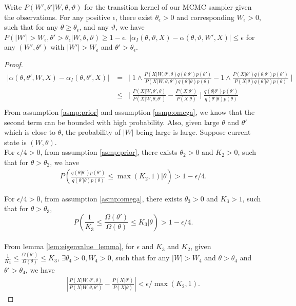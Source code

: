 \begin{proposition}
Write $P(W', \theta' | W, \theta, \vartheta)$ for the transition kernel of our MCMC sampler given the observations. For any positive $\epsilon$, there exist $\theta_\epsilon > 0$ and corresponding $W_\epsilon > 0$, such that for any $\theta \ge \theta_\epsilon$, and any $\vartheta$, we have
  $P(|W'| > W_\epsilon, \theta' > \theta_\epsilon  | W, \theta, \vartheta) \ge 1-\epsilon$.  $| \alpha_I(\theta,\vartheta,X) - \alpha(\theta,\vartheta,W',X)| 
  \le \epsilon $ for any $(W', \theta')$ with $|W'| > W_\epsilon$ and $\theta' > \theta_\epsilon$.
\label{prop:mix0}
\end{proposition}
\begin{proof}
\begin{align*}
|\alpha(\theta, \theta', W, X) - \alpha_I(\theta, \theta', X)| &= \ \mid 1 \wedge \frac{P(X | W, \theta' , \theta)q(\theta | \theta')p(\theta')}{P(X | W, \theta , \theta')q(\theta' | \theta)p(\theta)} - 1 \wedge \frac{P(X | \theta')q(\theta | \theta')p(\theta')}{P(X | \theta)q(\theta' | \theta)p(\theta)} \mid \\
& \leq \ \mid \frac{P(X | W, \theta' , \theta)}{P(X | W, \theta , \theta')} - \frac{P(X | \theta')}{P(X | \theta)} \mid \frac{q(\theta | \theta')p(\theta')}{q(\theta' | \theta)p(\theta)}\\
\end{align*}
From assumption \ref{asmp:prior} and assumption \ref{asmp:omega}, we know that the second term can be bounded with high probability. Also, given large $\theta$ and $\theta'$ which is close to $\theta$, the probability of $|W|$ being large is large.
Suppose current state is $(W, \theta)$.\\
For $\epsilon / 4 > 0$,  from assumption \ref{asmp:prior}, there exists $\theta_2 > 0$ and $K_2 > 0$, such that for $\theta > \theta_2$, we have
\begin{align*}
P(\frac{q(\theta | \theta')p(\theta')}{q(\theta' | \theta)p(\theta)} \leq \max(K_2, 1) | \theta) > 1 - \epsilon / 4.
\end{align*}

For $\epsilon/4 > 0$, from assumption \ref{asmp:omega}, there exists $\theta_3 > 0$ and $K_3 > 1$, such that for $\theta > \theta_3$, $$P(\frac{1}{K_3}  \leq \frac{\Omega(\theta')}{\Omega(\theta)} \leq K_3 | \theta) > 1 - \epsilon / 4 .$$\\

From lemma \ref{lem:eigenvalue_lemma}, for $\epsilon$ and $K_3$ and $K_2$, given $\frac{1}{K_3}  \leq \frac{\Omega(\theta')}{\Omega(\theta)}  \leq K_3 $, $\exists \theta_4 > 0, W_4 > 0$, such that for any $|W| > W_4$ and $\theta > \theta_4$ and $\theta' > \theta_4$, we have \begin{align*}
|\frac{P(X | W, \theta' , \theta)}{P(X | W, \theta , \theta')} - \frac{P(X | \theta')}{P(X | \theta)}| < \epsilon / \max(K_2, 1).
\end{align*}


\end{proof}
